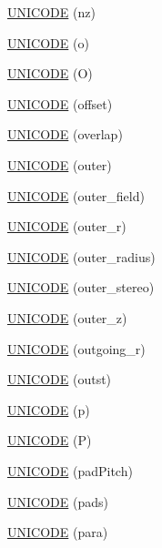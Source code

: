 \begin{DoxyCompactItemize}
\hyperlink{namespace_d_d4hep_1_1_x_m_l_ae25113385c091c6e5b882b0f358e52b0}{U\+N\+I\+C\+O\+DE} (nz)
\item 
\hyperlink{namespace_d_d4hep_1_1_x_m_l_a6e8618bf5d116c07d06cdb0f816f7ca0}{U\+N\+I\+C\+O\+DE} (o)
\item 
\hyperlink{namespace_d_d4hep_1_1_x_m_l_a525d1e19c48707481dbdf9d15a8562ee}{U\+N\+I\+C\+O\+DE} (O)
\item 
\hyperlink{namespace_d_d4hep_1_1_x_m_l_a634563af6b0ca4a9316ce60761501c3a}{U\+N\+I\+C\+O\+DE} (offset)
\item 
\hyperlink{namespace_d_d4hep_1_1_x_m_l_a03f4950576efa9ff83da27b945a84be5}{U\+N\+I\+C\+O\+DE} (overlap)
\item 
\hyperlink{namespace_d_d4hep_1_1_x_m_l_a971dd22e4691235c19b85cf9537686bb}{U\+N\+I\+C\+O\+DE} (outer)
\item 
\hyperlink{namespace_d_d4hep_1_1_x_m_l_a0a1bd670ca2912fd4d4e058abf4189f9}{U\+N\+I\+C\+O\+DE} (outer\+\_\+field)
\item 
\hyperlink{namespace_d_d4hep_1_1_x_m_l_aa949484cb3a6b414bc108e60cc01c9f7}{U\+N\+I\+C\+O\+DE} (outer\+\_\+r)
\item 
\hyperlink{namespace_d_d4hep_1_1_x_m_l_a24bda70c8cbf79860b98983e04cab6dd}{U\+N\+I\+C\+O\+DE} (outer\+\_\+radius)
\item 
\hyperlink{namespace_d_d4hep_1_1_x_m_l_a525f127cfb32b5f94ec544b46bda9d4c}{U\+N\+I\+C\+O\+DE} (outer\+\_\+stereo)
\item 
\hyperlink{namespace_d_d4hep_1_1_x_m_l_a5f682a2de9b110210df453f08d47e837}{U\+N\+I\+C\+O\+DE} (outer\+\_\+z)
\item 
\hyperlink{namespace_d_d4hep_1_1_x_m_l_a6e18cafe69c82b1e89e95f3c03dfe802}{U\+N\+I\+C\+O\+DE} (outgoing\+\_\+r)
\item 
\hyperlink{namespace_d_d4hep_1_1_x_m_l_a5c6ed695805ba9dbf0c0ff052543229b}{U\+N\+I\+C\+O\+DE} (outst)
\item 
\hyperlink{namespace_d_d4hep_1_1_x_m_l_a10c48be81b4e62ddd7f5fc7d4c6665f1}{U\+N\+I\+C\+O\+DE} (p)
\item 
\hyperlink{namespace_d_d4hep_1_1_x_m_l_a3b67f220a60d1ee7471909c199442706}{U\+N\+I\+C\+O\+DE} (P)
\item 
\hyperlink{namespace_d_d4hep_1_1_x_m_l_ad8a9fe5104d0b40b6fd0146c24592b5f}{U\+N\+I\+C\+O\+DE} (pad\+Pitch)
\item 
\hyperlink{namespace_d_d4hep_1_1_x_m_l_a954bcd789e301364b28540328241ec42}{U\+N\+I\+C\+O\+DE} (pads)
\item 
\hyperlink{namespace_d_d4hep_1_1_x_m_l_ad44f061bd695ec4771aa9ebd79016164}{U\+N\+I\+C\+O\+DE} (para)

\end{DoxyCompactItemize}
